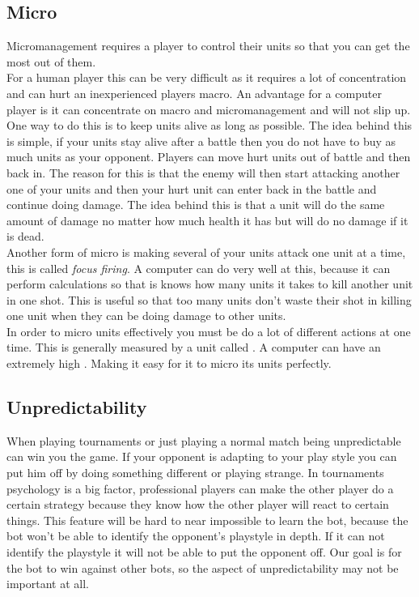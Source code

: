 				
	\subsection{Micro}
		Micromanagement requires a player to control their units so that you can get the most out of them.\\
		
		For a human player this can be very difficult as it requires a lot of concentration and can hurt an inexperienced players macro. 
		An advantage for a computer player is it can concentrate on macro and micromanagement and will not slip up.\\
		
		One way to do this is to keep units alive as long as possible. 
		The idea behind this is simple, if your units stay alive after a battle then you do not have to buy as much units as your opponent. 
		Players can move hurt units out of battle and then back in. 
		The reason for this is that the enemy will then start attacking another one of your 
		units and then your hurt unit can enter back in the battle and continue doing damage. 
		The idea behind this is that a unit will do the same amount of damage no matter how much health it has but will do no damage if it is dead.\\
		
		Another form of micro is making several of your units attack one unit at a time, this is called {\it focus firing}.
		A computer can do very well at this, because it can perform calculations so that is knows how many units it takes to kill another unit in one shot.
		This is useful so that too many units don't waste their shot in killing one unit when they can be doing damage to other units.\\
		In order to micro units effectively you must be do a lot of different actions at one time. 
		This is generally measured by a unit called \abapm. 
		A computer can have an extremely high \abapm. Making it easy for it to micro its units perfectly.
		
	\subsection{Unpredictability}
		When playing tournaments or just playing a normal match being unpredictable can win you the game. 
		If your opponent is adapting to your play style you can put him off by doing something different or playing strange.
		In tournaments psychology is a big factor, professional players can make the other player do a certain strategy because they know 
		how the other player will react to certain things. This feature will be hard to near impossible to learn the bot, because the bot won't be able to 
		identify the opponent's playstyle in depth. 
		If it can not identify the playstyle it will not be able to put the opponent off. Our goal is for the bot 
		to win against other bots, so the aspect of unpredictability may not be important at all. 
